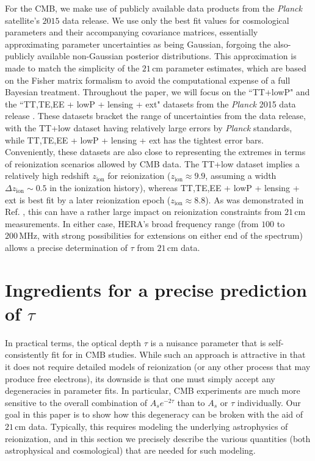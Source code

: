 \documentclass[twocolumn,aps,prd,nofootinbib,showpacs,superscriptaddress]{revtex4-1}
\begin{document}
For the CMB, we make use of publicly available data products from the \emph{Planck} satellite's $2015$ data release. We use only the best fit values for cosmological parameters and their accompanying covariance matrices, essentially approximating parameter uncertainties as being Gaussian, forgoing the also-publicly available non-Gaussian posterior distributions. This approximation is made to match the simplicity of the $21\,\textrm{cm}$ parameter estimates, which are based on the Fisher matrix formalism to avoid the computational expense of a full Bayesian treatment. Throughout the paper, we will focus on the ``TT+lowP" and the ``TT,TE,EE + lowP + lensing + ext" datasets from the \emph{Planck} 2015 data release \cite{Planck2015parameters,Planck2015likelihood}. These datasets bracket the range of uncertainties from the data release, with the TT+low dataset having relatively large errors by \emph{Planck} standards, while TT,TE,EE + lowP + lensing + ext has the tightest error bars. Conveniently, these datasets are also close to representing the extremes in terms of reionization scenarios allowed by CMB data. The TT+low dataset implies a relatively high redshift $z_\textrm{ion}$ for reionization ($z_\textrm{ion} \approx 9.9$, assuming a width $\Delta z_\textrm{ion} \sim 0.5$ in the ionization history), whereas TT,TE,EE + lowP + lensing + ext is best fit by a later reionization epoch ($z_\textrm{ion} \approx 8.8$). As was demonstrated in Ref. \cite{Liu_in_prep}, this can have a rather large impact on reionization constraints from $21\,\textrm{cm}$ measurements. In either case, HERA's broad frequency range (from $100$ to $200\,\textrm{MHz}$, with strong possibilities for extensions on either end of the spectrum) allows a precise determination of $\tau$ from $21\,\textrm{cm}$ data.

\section{Ingredients for a precise prediction of $\tau$ }
\label{sec:Ingredients}

In practical terms, the optical depth $\tau$ is a nuisance parameter that is self-consistently fit for in CMB studies. While such an approach is attractive in that it does not require detailed models of reionization (or any other process that may produce free electrons), its downside is that one must simply accept any degeneracies in parameter fits. In particular, CMB experiments are much more sensitive to the overall combination of $A_s e^{-2\tau}$ than to $A_s$ or $\tau$ individually. Our goal in this paper is to show how this degeneracy can be broken with the aid of $21\,\textrm{cm}$ data. Typically, this requires modeling the underlying astrophysics of reionization, and in this section we precisely describe the various quantities (both astrophysical and cosmological) that are needed for such modeling.
\end{document}
